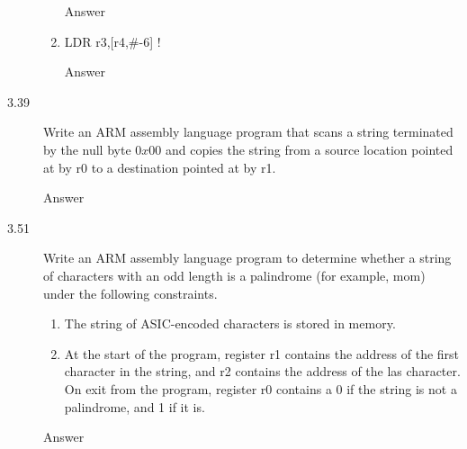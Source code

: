 \documentclass[letterpaper,10pt,titlepage]{article}
\begin{document}
\begin{description}
\begin{enumerate}
        Answer
        \item LDR r3,[r4,\#-6] !
        
        Answer
    \end{enumerate}
    \item[3.39] Write an ARM assembly language program that scans a string terminated by the null byte $0x00$ and copies the string from a source location pointed at by r0 to a destination pointed at by r1.
    
    Answer
    \item[3.51] Write an ARM assembly language program to determine whether a string of characters with an odd length is a palindrome (for example, mom) under the following constraints.
    \begin{enumerate}
        \item The string of ASIC-encoded characters is stored in memory.
        \item At the start of the program, register r1 contains the address of the first character in the string, and r2 contains the address of the las character. On exit from the program, register r0 contains a 0 if the string is not a palindrome, and 1 if it is.
    \end{enumerate}
    
    Answer
\end{description}

%
\end{document}
